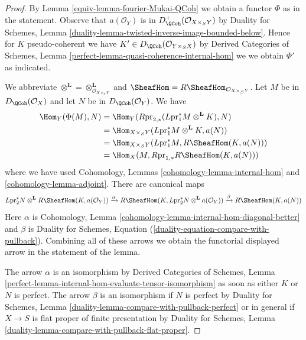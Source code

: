 \begin{proof}

By Lemma \ref{equiv-lemma-fourier-Mukai-QCoh} we obtain a functor $\Phi$
as in the statement. Observe that $a(\mathcal{O}_Y)$ is in
$D^+_\QCoh(\mathcal{O}_{X \times_S Y})$ by Duality for Schemes,
Lemma \ref{duality-lemma-twisted-inverse-image-bounded-below}.
Hence for $K$ pseudo-coherent we have
$K' \in D_\QCoh(\mathcal{O}_{Y \times_S X})$
by Derived Categories of Schemes, Lemma
\ref{perfect-lemma-quasi-coherence-internal-hom}
we we obtain $\Phi'$ as indicated.

\medskip\noindent
We abbreviate
$\otimes^\mathbf{L} = \otimes_{\mathcal{O}_{X \times_S Y}}^\mathbf{L}$
and
$\SheafHom = R\SheafHom_{\mathcal{O}_{X \times_S Y}}$.
Let $M$ be in $D_\QCoh(\mathcal{O}_X)$ and let
$N$ be in $D_\QCoh(\mathcal{O}_Y)$. We have
\begin{align*}
\Hom_Y(\Phi(M), N)
& =
\Hom_Y(R\text{pr}_{2, *}(L\text{pr}_1^*M \otimes^\mathbf{L} K), N) \\
& =
\Hom_{X \times_S Y}(L\text{pr}_1^*M \otimes^\mathbf{L} K, a(N)) \\
& =
\Hom_{X \times_S Y}(L\text{pr}_1^*M,
R\SheafHom(K, a(N))) \\
& =
\Hom_X(M, R\text{pr}_{1, *}R\SheafHom(K, a(N)))
\end{align*}
where we have used Cohomology, Lemmas \ref{cohomology-lemma-internal-hom}
and \ref{cohomology-lemma-adjoint}. There are canonical maps
$$
L\text{pr}_2^*N \otimes^\mathbf{L} R\SheafHom(K, a(\mathcal{O}_Y))
\xrightarrow{\alpha}
R\SheafHom(K, L\text{pr}_2^*N \otimes^\mathbf{L} a(\mathcal{O}_Y))
\xrightarrow{\beta}
R\SheafHom(K, a(N))
$$
Here $\alpha$ is
Cohomology, Lemma \ref{cohomology-lemma-internal-hom-diagonal-better}
and $\beta$ is Duality for Schemes, Equation
(\ref{duality-equation-compare-with-pullback}).
Combining all of these arrows we obtain the functorial displayed
arrow in the statement of the lemma.

\medskip\noindent
The arrow $\alpha$ is an isomorphism by
Derived Categories of Schemes, Lemma
\ref{perfect-lemma-internal-hom-evaluate-tensor-isomorphism}
as soon as either $K$ or $N$ is perfect.
The arrow $\beta$ is an isomorphism if $N$ is perfect by
Duality for Schemes, Lemma \ref{duality-lemma-compare-with-pullback-perfect}
or in general if $X \to S$ is
flat proper of finite presentation by
Duality for Schemes, Lemma
\ref{duality-lemma-compare-with-pullback-flat-proper}.
\end{proof}

